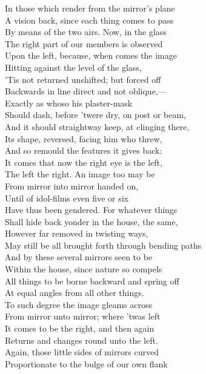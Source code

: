 In those which render from the mirror's plane\\
A vision back, since each thing comes to pass\\
By means of the two airs. Now, in the glass\\
The right part of our members is observed\\
Upon the left, because, when comes the image\\
Hitting against the level of the glass,\\
'Tis not returned unshifted; but forced off\\
Backwards in line direct and not oblique,—\\
Exactly as whoso his plaster-mask\\
Should dash, before 'twere dry, on post or beam,\\
And it should straightway keep, at clinging there,\\
Its shape, reversed, facing him who threw,\\
And so remould the features it gives back:\\
It comes that now the right eye is the left,\\
The left the right. An image too may be\\
From mirror into mirror handed on,\\
Until of idol-films even five or six\\
Have thus been gendered. For whatever things\\
Shall hide back yonder in the house, the same,\\
However far removed in twisting ways,\\
May still be all brought forth through bending paths\\
And by these several mirrors seen to be\\
Within the house, since nature so compels\\
All things to be borne backward and spring off\\
At equal angles from all other things.\\
To such degree the image gleams across\\
From mirror unto mirror; where 'twas left\\
It comes to be the right, and then again\\
Returns and changes round unto the left.\\
Again, those little sides of mirrors curved\\
Proportionate to the bulge of our own flank\\
